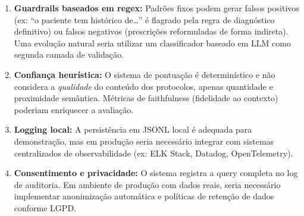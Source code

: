 \begin{enumerate}
    \item \textbf{Guardrails baseados em regex:} Padrões fixos podem gerar falsos positivos (ex: ``o paciente tem histórico de\ldots'' é flagrado pela regra de diagnóstico definitivo) ou falsos negativos (prescrições reformuladas de forma indireta). Uma evolução natural seria utilizar um classificador baseado em LLM como segunda camada de validação.

    \item \textbf{Confiança heurística:} O sistema de pontuação é determinístico e não considera a \emph{qualidade} do conteúdo dos protocolos, apenas quantidade e proximidade semântica. Métricas de faithfulness (fidelidade ao contexto) poderiam enriquecer a avaliação.

    \item \textbf{Logging local:} A persistência em JSONL local é adequada para demonstração, mas em produção seria necessário integrar com sistemas centralizados de observabilidade (ex: ELK Stack, Datadog, OpenTelemetry).

    \item \textbf{Consentimento e privacidade:} O sistema registra a query completa no log de auditoria. Em ambiente de produção com dados reais, seria necessário implementar anonimização automática e políticas de retenção de dados conforme LGPD.
\end{enumerate}
